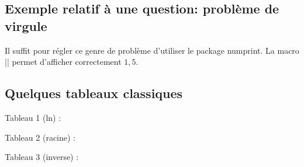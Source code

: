 \subsection{Exemple relatif à une question: problème de virgule}

Il suffit pour régler ce genre de problème d'utiliser le package numprint.
La macro |\np| permet d'afficher correctement $1,5$.
\begin{tkzexample}
\usepackage[french]{babel}
\usepackage[np]{numprint}
\end{tkzexample}

\begin{tkzexample}[vbox]
\end{tkzexample}

\subsection{Quelques tableaux classiques}

Tableau 1 (ln) :

\begin{tkzexample}
\end{tkzexample}


\bigskip

Tableau 2 (racine) :

\begin{tkzexample}
\end{tkzexample}

\bigskip

Tableau 3 (inverse) :

\begin{tkzexample}
\end{tkzexample}

